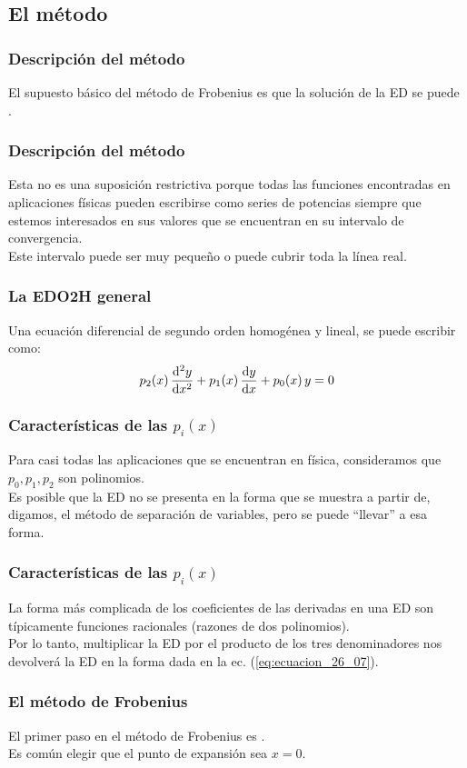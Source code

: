\documentclass[12pt]{beamer}
\begin{document}
\subsection{El método}

\begin{frame}
\frametitle{Descripción del método}
El supuesto básico del método de Frobenius es que la solución de la ED se puede .
\end{frame}
\begin{frame}
\frametitle{Descripción del método}
Esta no es una suposición restrictiva porque todas las funciones encontradas en aplicaciones físicas pueden escribirse como series de potencias siempre que estemos interesados en sus valores que se encuentran en su intervalo de convergencia.
\\
\bigskip
\pause
Este intervalo puede ser muy pequeño o puede cubrir toda la línea real.
\end{frame}
\begin{frame}
\frametitle{La EDO2H general}
Una ecuación diferencial de segundo orden homogénea y lineal, se puede escribir como:
\pause
\begin{align}
p_{2} (x) \, \dv[2]{y}{x} + p_{1} (x) \, \dv{y}{x} + p_{0} (x) \, y = 0
\label{eq:ecuacion_26_07}    
\end{align}
\end{frame}
\begin{frame}
\frametitle{Características de las $p_{i}(x)$}
Para casi todas las aplicaciones que se encuentran en física, consideramos que $p_{0}, p_{1}, p_{2}$ son polinomios.
\\
\bigskip
\pause
Es posible que la ED no se presenta en la forma que se muestra a partir de, digamos, el método de separación de variables, pero se puede \enquote{llevar} a esa forma.
\end{frame}
\begin{frame}
\frametitle{Características de las $p_{i}(x)$}
La forma más complicada de los coeficientes de las derivadas en una ED son típicamente funciones racionales (razones de dos polinomios).
\\
\bigskip
\pause
Por lo tanto, multiplicar la ED por el producto de los tres denominadores nos devolverá la ED en la forma dada en la ec. (\ref{eq:ecuacion_26_07}).
\end{frame}
\begin{frame}
\frametitle{El método de Frobenius}
El primer paso en el método de Frobenius es .
\\
\bigskip
\pause
Es común elegir que el punto de expansión sea $x = 0$.
\end{frame}
\end{document}
